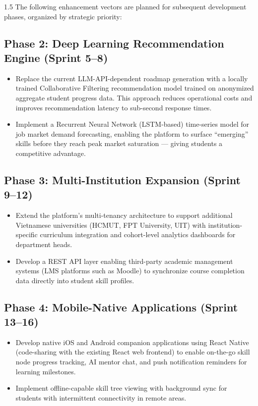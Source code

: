 \documentclass[12pt,a4paper]{report}
\begin{document}
\begin{spacing}{1.5}
		The following enhancement vectors are planned for subsequent development phases, organized by strategic priority:
		
		\subsection{Phase 2: Deep Learning Recommendation Engine (Sprint 5--8)}
		
		\begin{itemize}
			\item Replace the current LLM-API-dependent roadmap generation with a locally trained Collaborative Filtering recommendation model trained on anonymized aggregate student progress data. This approach reduces operational costs and improves recommendation latency to sub-second response times.
			\item Implement a Recurrent Neural Network (LSTM-based) time-series model for job market demand forecasting, enabling the platform to surface ``emerging'' skills before they reach peak market saturation --- giving students a competitive advantage.
		\end{itemize}
		
		\subsection{Phase 3: Multi-Institution Expansion (Sprint 9--12)}
		
		\begin{itemize}
			\item Extend the platform's multi-tenancy architecture to support additional Vietnamese universities (HCMUT, FPT University, UIT) with institution-specific curriculum integration and cohort-level analytics dashboards for department heads.
			\item Develop a REST API layer enabling third-party academic management systems (LMS platforms such as Moodle) to synchronize course completion data directly into student skill profiles.
		\end{itemize}
		
		\subsection{Phase 4: Mobile-Native Applications (Sprint 13--16)}
		
		\begin{itemize}
			\item Develop native iOS and Android companion applications using React Native (code-sharing with the existing React web frontend) to enable on-the-go skill node progress tracking, AI mentor chat, and push notification reminders for learning milestones.
			\item Implement offline-capable skill tree viewing with background sync for students with intermittent connectivity in remote areas.
		\end{itemize}
		

\end{spacing}
\end{document}
